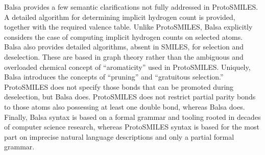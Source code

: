 \documentclass{article}
\begin{document}
Balsa provides a few semantic clarifications not fully addressed in ProtoSMILES. A detailed algorithm for determining implicit hydrogen count is provided, together with the required valence table. Unlike ProtoSMILES, Balsa explicitly considers the case of computing implicit hydrogen counts on selected atoms. Balsa also provides detailed algorithms, absent in SMILES, for selection and deselection. These are based in graph theory rather than the ambiguous and overloaded chemical concept of \enquote{aromaticity} used in ProtoSMILES. Uniquely, Balsa introduces the concepts of \enquote{pruning} and \enquote{gratuitous selection.} ProtoSMILES does not specify those bonds that can be promoted during deselection, but Balsa does. ProtoSMILES does not restrict partial parity bonds to those atoms also possessing at least one double bond, whereas Balsa does. Finally, Balsa syntax is based on a formal grammar and tooling rooted in decades of computer science research, whereas ProtoSMILES syntax is based for the most part on imprecise natural language descriptions and only a partial formal grammar.
\end{document}

